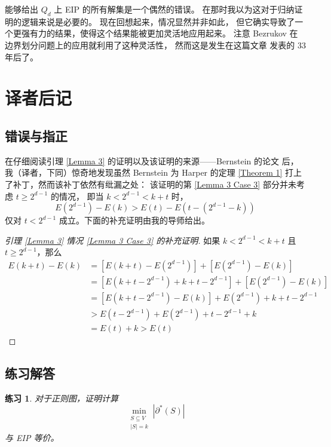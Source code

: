 \documentclass[12pt, a4paper]{article}
\newtheorem{exercisewithanswer}{练习}
\begin{document}
能够给出 $Q_d$ 上 EIP 的所有解集是一个偶然的错误。
在那时我以为这对于归纳证明的逻辑来说是必要的。
现在回想起来，情况显然并非如此，
但它确实导致了一个更强有力的结果，使得这个结果能被更加灵活地应用起来。
注意 Bezrukov 在边界划分问题上的应用就利用了这种灵活性，
然而这是发生在这篇文章 \cite{Harper.1964} 发表的 33 年后了。

\section{译者后记}
\label{Section 5}

\subsection{错误与指正}
\label{Subsection 5.1}

在仔细阅读引理 \ref{Lemma 3} 的证明以及该证明的来源——Bernstein 的论文
\cite{Bernstein.1967} 后，我（译者，下同）惊奇地发现虽然 Bernstein 为 Harper
的定理 \ref{Theorem 1} 打上了补丁，然而该补丁依然有纰漏之处：
该证明的第 \ref{Lemma 3 Case 3} 部分并未考虑 $t \ge 2^{d - 1}$ 的情况，
即当 $k < 2^{d − 1} < k + t$ 时，
\begin{equation*}
E(2^{d − 1}) − E(k) > E(t) − E(t − (2^{d − 1} − k))
\end{equation*}
仅对 $t < 2^{d - 1}$ 成立。下面的补充证明由我的导师给出。
\begin{proof}[引理 \ref{Lemma 3} 情况 \ref{Lemma 3 Case 3} 的补充证明]
如果 $k < 2^{d − 1} < k + t$ 且 $t \ge 2^{d - 1}$，那么
\begin{align*}
E(k + t) - E(k) & = \left[E(k + t) - E(2^{d - 1})\right] +
		    \left[E(2^{d - 1}) - E(k)\right] \\
		& = \left[E(k + t - 2^{d - 1}) + k + t - 2^{d - 1}\right] +
		    \left[E(2^{d - 1}) - E(k)\right] \\
		& = \left[E(k + t - 2^{d - 1}) - E(k)\right] +
		    E(2^{d - 1}) + k + t - 2^{d - 1} \\
		& > E(t - 2^{d - 1}) + E(2^{d - 1}) + t - 2^{d - 1} + k \\
		& = E(t) + k > E(t)
\end{align*}
\end{proof}

\subsection{练习解答}
\label{Subsection 5.2}

\begin{exercisewithanswer}
对于正则图，证明计算
\begin{equation*}
\min_{\substack{
	S \subseteq V \\
	|S| = k
}}|\partial^\ast(S)|
\end{equation*}
与 EIP 等价。
\end{exercisewithanswer}
\end{document}
